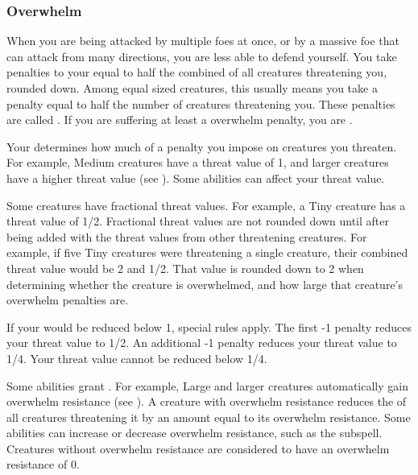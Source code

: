         \subsubsection{Overwhelm}\label{Overwhelm}
            When you are being attacked by multiple foes at once, or by a massive foe that can attack from many directions, you are less able to defend yourself.
            You take penalties to your  equal to half the combined  of all creatures threatening you, rounded down.
            Among equal sized creatures, this usually means you take a penalty equal to half the number of creatures threatening you.
            These penalties are called .
            If you are suffering at least a  overwhelm penalty, you are .

            \label{Threat Value} Your  determines how much of a penalty you impose on creatures you threaten.
            For example, Medium creatures have a threat value of 1, and larger creatures have a higher threat value (see ).
            Some abilities can affect your threat value.

            Some creatures have fractional threat values.
            For example, a Tiny creature has a threat value of 1/2.
            Fractional threat values are not rounded down until after being added with the threat values from other threatening creatures.
            For example, if five Tiny creatures were threatening a single creature, their combined threat value would be 2 and 1/2.
            That value is rounded down to 2 when determining whether the creature is overwhelmed, and how large that creature's overwhelm penalties are.

            If your  would be reduced below 1, special rules apply.
            The first -1 penalty reduces your threat value to 1/2.
            An additional -1 penalty reduces your threat value to 1/4.
            Your threat value cannot be reduced below 1/4.

            \label{Overwhelm Resistance} Some abilities grant .
            For example, Large and larger creatures automatically gain overwhelm resistance (see ).
            A creature with overwhelm resistance reduces the  of all creatures threatening it by an amount equal to its overwhelm resistance.
            Some abilities can increase or decrease overwhelm resistance, such as the  subspell.
            Creatures without overwhelm resistance are considered to have an overwhelm resistance of 0.

